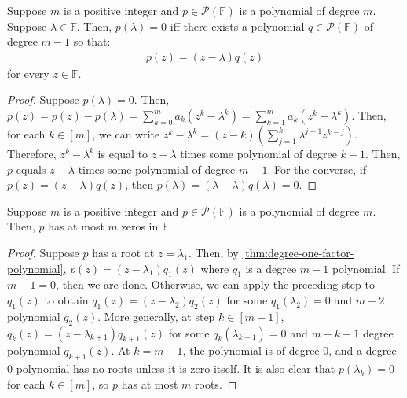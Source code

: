 \documentclass{article}
\begin{document}
\begin{theorem}
  \label{thm:degree-one-factor-polynomial}
  Suppose $m$ is a positive integer and $p \in
  \mathcal{P}(\mathbb{F})$ is a polynomial of degree $m$. Suppose
  $\lambda \in \mathbb{F}$. Then, $p(\lambda) = 0$ iff there exists a
  polynomial $q \in \mathcal{P}(\mathbb{F})$ of degree $m - 1$ so
  that:
  \begin{align*}
    p(z) = (z - \lambda)q(z)
  \end{align*}
  for every $z \in \mathbb{F}$.
\end{theorem}
\begin{proof}
  Suppose $p(\lambda) = 0$. Then, $p(z) = p(z) - p(\lambda) =
  \sum_{k=0}^m a_k (z^k - \lambda^k) = \sum_{k=1}^m a_k (z^k -
  \lambda^k)$. Then, for each $k \in [m]$, we can write $z^k -
  \lambda^k = (z - k)(\sum_{j=1}^k \lambda^{j-1} z^{k-j})$. Therefore,
  $z^k - \lambda^k$ is equal to $z - \lambda$ times some polynomial of
  degree $k - 1$. Then, $p$ equals $z - \lambda$ times some polynomial
  of degree $m - 1$. For the converse, if $p(z) = (z - \lambda)q(z)$,
  then $p(\lambda) = (\lambda - \lambda)q(\lambda) = 0$.
\end{proof}

\begin{theorem}
  \label{thm:degree-m-polynomial-has-at-most-m-zeros}
  Suppose $m$ is a positive integer and $p \in
  \mathcal{P}(\mathbb{F})$ is a polynomial of degree $m$. Then, $p$
  has at most $m$ zeros in $\mathbb{F}$.
\end{theorem}
\begin{proof}
  Suppose $p$ has a root at $z = \lambda_1$. Then, by
  \cref{thm:degree-one-factor-polynomial}, $p(z) = (z - \lambda_1)
  q_1(z)$ where $q_1$ is a degree $m - 1$ polynomial. If $m - 1 = 0$,
  then we are done. Otherwise, we can apply the preceding step to
  $q_1(z)$ to obtain $q_1(z) = (z - \lambda_2)q_2(z)$ for some
  $q_1(\lambda_2) = 0$ and $m - 2$ polynomial $q_2(z)$. More generally, at step
  $k \in [m - 1]$, $q_k(z) = (z - \lambda_{k+1})q_{k+1}(z)$ for some
  $q_{k}(\lambda_{k+1}) = 0$ and $m - k - 1$ degree polynomial
  $q_{k+1}(z)$. At $k = m - 1$, the polynomial is of degree $0$, and a
  degree $0$ polynomial has no roots unless it is zero itself. It is
  also clear that $p(\lambda_k) = 0$ for each $k \in [m]$, so $p$ has
  at most $m$ roots.
\end{proof}
\end{document}
